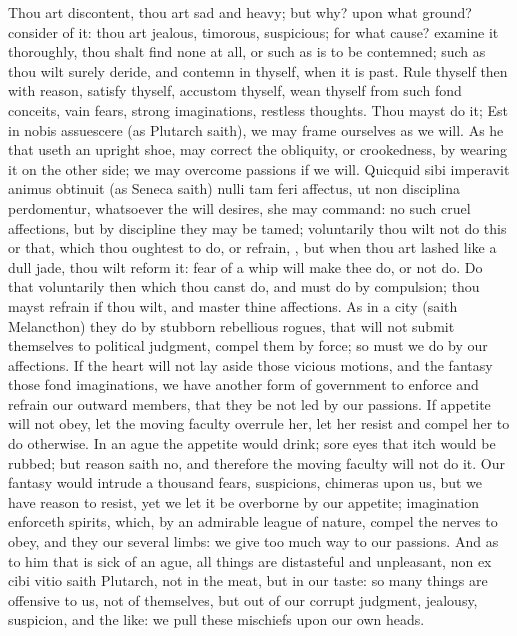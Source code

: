 {Thou art discontent, thou art sad and heavy; but why? upon what ground?
consider of it: thou art jealous, timorous, suspicious; for what cause?
examine it thoroughly, thou shalt find none at all, or such as is to be
contemned; such as thou wilt surely deride, and contemn in thyself,
when it is past. Rule thyself then with reason, satisfy thyself,
accustom thyself, wean thyself from such fond conceits, vain fears,
strong imaginations, restless thoughts. Thou mayst do it; Est in nobis
assuescere (as Plutarch saith), we may frame ourselves as we will. As
he that useth an upright shoe, may correct the obliquity, or
crookedness, by wearing it on the other side; we may overcome passions
if we will. Quicquid sibi imperavit animus obtinuit (as Seneca
saith) nulli tam feri affectus, ut non disciplina perdomentur,
whatsoever the will desires, she may command: no such cruel affections,
but by discipline they may be tamed; voluntarily thou wilt not do this
or that, which thou oughtest to do, or refrain, \etc{}, but when thou art
lashed like a dull jade, thou wilt reform it: fear of a whip will make
thee do, or not do. Do that voluntarily then which thou canst do, and
must do by compulsion; thou mayst refrain if thou wilt, and master
thine affections. As in a city (saith Melancthon) they do by
stubborn rebellious rogues, that will not submit themselves to
political judgment, compel them by force; so must we do by our
affections. If the heart will not lay aside those vicious motions, and
the fantasy those fond imaginations, we have another form of government
to enforce and refrain our outward members, that they be not led by our
passions. If appetite will not obey, let the moving faculty overrule
her, let her resist and compel her to do otherwise. In an ague the
appetite would drink; sore eyes that itch would be rubbed; but reason
saith no, and therefore the moving faculty will not do it. Our fantasy
would intrude a thousand fears, suspicions, chimeras upon us, but we
have reason to resist, yet we let it be overborne by our appetite;
imagination enforceth spirits, which, by an admirable league of
nature, compel the nerves to obey, and they our several limbs: we give
too much way to our passions. And as to him that is sick of an ague,
all things are distasteful and unpleasant, non ex cibi vitio saith
Plutarch, not in the meat, but in our taste: so many things are
offensive to us, not of themselves, but out of our corrupt judgment,
jealousy, suspicion, and the like: we pull these mischiefs upon our own
heads.

}
